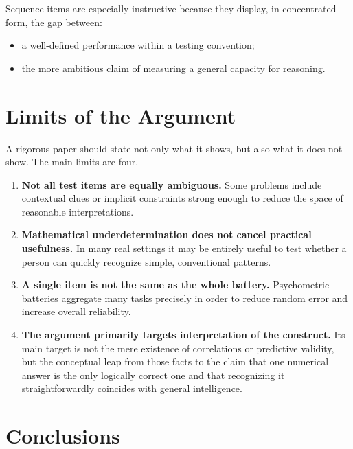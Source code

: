 \documentclass[10pt, a4paper]{article}
\theoremstyle{plain}
\theoremstyle{definition}
\theoremstyle{remark}
\begin{document}
Sequence items are especially instructive because they display, in concentrated
form, the gap between:
\begin{itemize}
    \item a well-defined performance within a testing convention;
    \item the more ambitious claim of measuring a general capacity for
          reasoning.
\end{itemize}

\section{Limits of the Argument}
\label{sec:limits}

A rigorous paper should state not only what it shows, but also what it does not
show. The main limits are four.

\begin{enumerate}[label=\arabic*.]
    \item \textbf{Not all test items are equally ambiguous.}
          Some problems include contextual clues or implicit constraints strong
          enough to reduce the space of reasonable interpretations.

    \item \textbf{Mathematical underdetermination does not cancel practical
          usefulness.} In many real settings it may be entirely useful to test
          whether a person can quickly recognize simple, conventional patterns.

    \item \textbf{A single item is not the same as the whole battery.}
          Psychometric batteries aggregate many tasks precisely in order to
          reduce random error and increase overall reliability.

    \item \textbf{The argument primarily targets interpretation of the
          construct.} Its main target is not the mere existence of correlations
          or predictive validity, but the conceptual leap from those facts to
          the claim that one numerical answer is the only logically correct one
          and that recognizing it straightforwardly coincides with general
          intelligence.
\end{enumerate}

\section{Conclusions}
\label{sec:conclusion}
\end{document}
